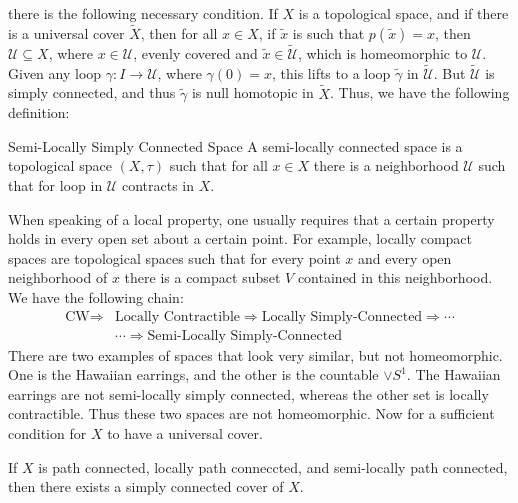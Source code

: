     there is the following necessary condition.
    If $X$ is a topological space, and if there is a
    universal cover $\tilde{X}$, then for all
    $x\in{X}$, if $\tilde{x}$ is such that
    $p(\tilde{x})=x$, then $\mathcal{U}\subseteq{X}$, where
    $x\in\mathcal{U}$, evenly covered and
    $\tilde{x}\in\tilde{\mathcal{U}}$, which is homeomorphic
    to $\mathcal{U}$. Given any loop
    $\gamma:I\rightarrow\mathcal{U}$, where $\gamma(0)=x$,
    this lifts to a loop $\tilde{\gamma}$ in
    $\tilde{\mathcal{U}}$. But $\tilde{\mathcal{U}}$ is
    simply connected, and thus $\tilde{\gamma}$ is null
    homotopic in $\tilde{X}$. Thus, we have the following
    definition:
    \begin{ldefinition}{Semi-Locally Simply Connected Space}
        A semi-locally connected space is a topological
        space $(X,\tau)$ such that for all $x\in{X}$ there is
        a neighborhood $\mathcal{U}$ such that for loop in
        $\mathcal{U}$ contracts in $X$.
    \end{ldefinition}
    When speaking of a local property, one usually requires that
    a certain property holds in every open set about a certain
    point. For example, locally compact spaces are topological
    spaces such that for every point $x$ and every open
    neighborhood of $x$ there is a compact subset $V$ contained
    in this neighborhood. We have the following chain:
    \begin{equation}
        \begin{split}
            \textrm{CW}\Longrightarrow
            &\textrm{Locally Contractible}\Longrightarrow
            \textrm{Locally Simply-Connected}
            \Longrightarrow\cdots\\
            &\cdots\Longrightarrow
            \textrm{Semi-Locally Simply-Connected}
        \end{split}
    \end{equation}
    There are two examples of spaces that look very similar,
    but not homeomorphic. One is the Hawaiian earrings, and
    the other is the countable $\lor{S}^{1}$. The Hawaiian
    earrings are not semi-locally simply connected, whereas
    the other set is locally contractible. Thus these two
    spaces are not homeomorphic. Now for a sufficient condition
    for $X$ to have a universal cover.
    \begin{theorem}
        If $X$ is path connected, locally path conneccted,
        and semi-locally path connected, then there exists
        a simply connected cover of $X$.
    \end{theorem}
